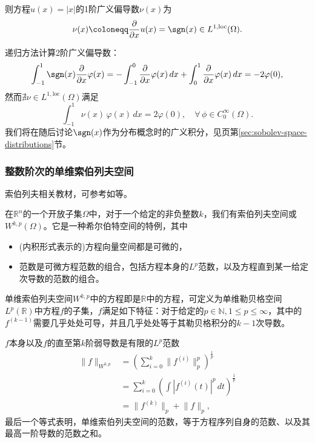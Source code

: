则方程$u(x) = \left| x \right|$的1阶广义偏导数$\nu(x)$为
\begin{equation*}
  \nu(x) \coloneqq \frac{\partial}{\partial x}u(x) = \sgn(x) \in L^{1,\text{loc}}(\Omega).
\end{equation*}

递归方法计算2阶广义偏导数：
\begin{equation}
  \label{eq:sobolev-distribution-sgnx}
  \int_{-1}^{1}\sgn(x) \frac{\partial}{\partial x} \varphi(x) = -\int_{-1}^{0} \frac{\partial}{\partial x} \varphi(x) \, dx
  + \int_{0}^1 \frac{\partial}{\partial x} \varphi(x) \, dx = -2 \varphi(0),
\end{equation}
然而$\nexists \nu \in L^{1,\text{loc}}(\Omega)$满足
\begin{equation*}
  \int_{-1}^{1} \nu(x) \, \varphi(x) \, dx = 2 \varphi(0), \quad \forall \, \phi \in C_0^{\infty}(\Omega).
\end{equation*}
我们将在随后讨论$\sgn(x)$作为分布概念时的广义积分，见\pageref{sec:sobolev-space-distributions}页第\ref{sec:sobolev-space-distributions}节。


\subsubsection{整数阶次的单维索伯列夫空间}

索伯列夫相关教材，可参考如\cite{Adams:2003wi, Tartar:2007vm, Mazya:2009vz, Mazya:2009wu}等。


在$\mathbb{R}^n$的一个开放子集$\Omega$中，对于一个给定的非负整数$k$，我们有索伯列夫空间或$W^{k,p}(\Omega)$。它是一种希尔伯特空间的特例，其中
\begin{itemize}
  \item (内积形式表示的)方程向量空间都是可微的，
  \item 范数是可微方程范数的组合，包括方程本身的$L^p$范数，以及方程直到某一给定次导数的范数的组合。
\end{itemize}

单维索伯列夫空间$W^{k,p}$中的方程即是$\mathbb{R}$中的方程，可定义为单维勒贝格空间$L^{p}(\mathbb{R})$中方程$f$的子集，$f$满足如下特征：对于给定的$p \in \mathbb{N}, 1 \le p \le \infty$，其中的$f^{(k-1)}$需要几乎处处可导，并且几乎处处等于其勒贝格积分的$k-1$次导数。

$f$本身以及$f$的直至第$k$阶弱导数是有限的$L^p$范数
\begin{equation*}
  \begin{split}
      \big\| f \big\|_{W^{k,p}} &= \left( \sum_{i=0}^{k} \big\| f^{(i)} \big\|_p^p \right)^{\frac{1}{p}} \\
      &= \sum_{i=0}^{k} \left( \int \left| f^{(i)}(t) \right|^p \, dt \right)^{\frac{1}{p}} \\
      &= \big\| f^{(k)} \big\|_p + \big\| f \big\|_p,
  \end{split}
\end{equation*}
最后一个等式表明，单维索伯列夫空间的范数，等于方程序列自身的范数、以及其最高一阶导数的范数之和。

